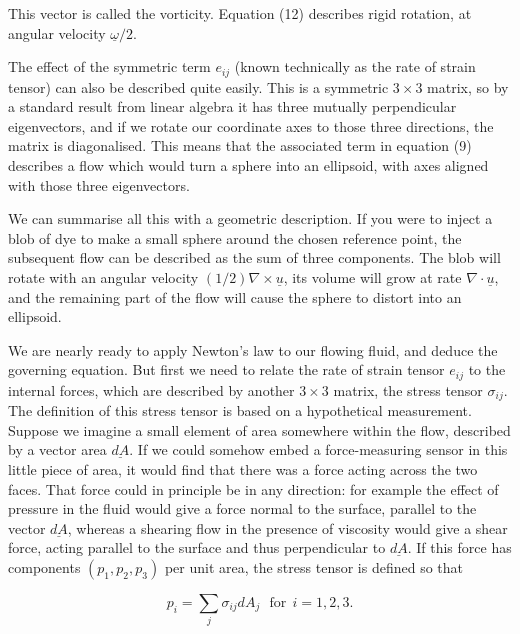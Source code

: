   This vector is called the vorticity. Equation (12) describes rigid rotation, 
  at angular velocity $\underline{\omega}/2$. 

  The effect of the symmetric term $e_{ij}$ (known technically as the rate of 
  strain tensor) can also be described quite easily. This is a symmetric $3 
  \times 3$ matrix, so by a standard result from linear algebra it has three 
  mutually perpendicular eigenvectors, and if we rotate our coordinate axes to 
  those three directions, the matrix is diagonalised. This means that the 
  associated term in equation (9) describes a flow which would turn a sphere 
  into an ellipsoid, with axes aligned with those three eigenvectors. 

  We can summarise all this with a geometric description. If you were to inject 
  a blob of dye to make a small sphere around the chosen reference point, the 
  subsequent flow can be described as the sum of three components. The blob 
  will rotate with an angular velocity $(1/2)\nabla \times \underline{u}$, its 
  volume will grow at rate $\nabla \cdot \underline{u}$, and the remaining part 
  of the flow will cause the sphere to distort into an ellipsoid. 

  We are nearly ready to apply Newton's law to our flowing fluid, and deduce 
  the governing equation. But first we need to relate the rate of strain tensor 
  $e_{ij}$ to the internal forces, which are described by another $3 \times 3$ 
  matrix, the stress tensor $\sigma_{ij}$. The definition of this stress tensor 
  is based on a hypothetical measurement. Suppose we imagine a small element of 
  area somewhere within the flow, described by a vector area $\underline{dA}$. 
  If we could somehow embed a force-measuring sensor in this little piece of 
  area, it would find that there was a force acting across the two faces. That 
  force could in principle be in any direction: for example the effect of 
  pressure in the fluid would give a force normal to the surface, parallel to 
  the vector $\underline{dA}$, whereas a shearing flow in the presence of 
  viscosity would give a shear force, acting parallel to the surface and thus 
  perpendicular to $\underline{dA}$. If this force has components 
  $(p_1,p_2,p_3)$ per unit area, the stress tensor is defined so that 

  \begin{equation*}p_i=\sum_j{\sigma_{ij} dA_j}\mathrm{~~~for~~}i=1,2,3 . 
  \tag{14}\end{equation*} 

